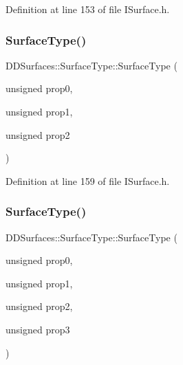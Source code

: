Definition at line 153 of file I\+Surface.\+h.

\hypertarget{class_d_d_surfaces_1_1_surface_type_a1edfc7bc6145d352f1dff360f91b97c0}{}\label{class_d_d_surfaces_1_1_surface_type_a1edfc7bc6145d352f1dff360f91b97c0} 
\subsubsection{\texorpdfstring{Surface\+Type()}{SurfaceType()}\hspace{0.1cm}{\footnotesize\ttfamily [4/6]}}
{\footnotesize\ttfamily D\+D\+Surfaces\+::\+Surface\+Type\+::\+Surface\+Type (\begin{DoxyParamCaption}\item[{unsigned}]{prop0,  }\item[{unsigned}]{prop1,  }\item[{unsigned}]{prop2 }\end{DoxyParamCaption})\hspace{0.3cm}{\ttfamily [inline]}}



Definition at line 159 of file I\+Surface.\+h.

\hypertarget{class_d_d_surfaces_1_1_surface_type_a14d8c8c9ca24104930ff64b27774b916}{}\label{class_d_d_surfaces_1_1_surface_type_a14d8c8c9ca24104930ff64b27774b916} 
\subsubsection{\texorpdfstring{Surface\+Type()}{SurfaceType()}\hspace{0.1cm}{\footnotesize\ttfamily [5/6]}}
{\footnotesize\ttfamily D\+D\+Surfaces\+::\+Surface\+Type\+::\+Surface\+Type (\begin{DoxyParamCaption}\item[{unsigned}]{prop0,  }\item[{unsigned}]{prop1,  }\item[{unsigned}]{prop2,  }\item[{unsigned}]{prop3 }\end{DoxyParamCaption})\hspace{0.3cm}{\ttfamily [inline]}}



